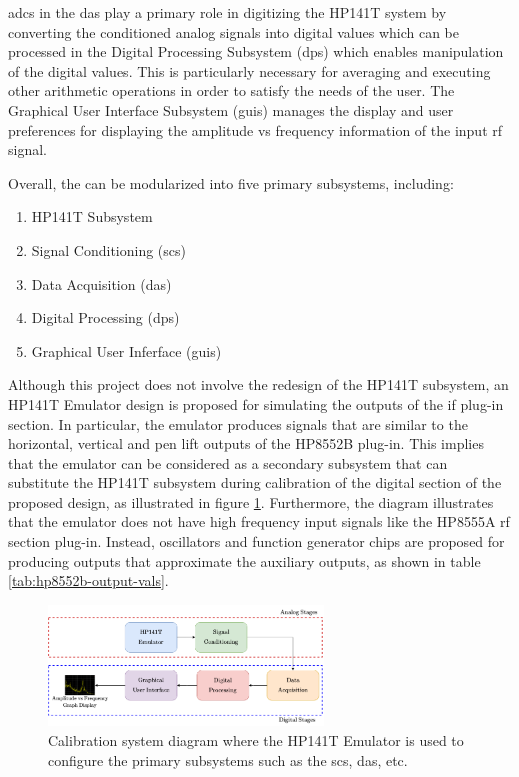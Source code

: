 \documentclass[class=report,11pt,crop=false]{standalone}
\begin{document}
	\acrshort{adc}s in the \acrshort{das} play a primary role in digitizing the HP141T system by converting the conditioned analog signals into digital values which can be processed in the Digital Processing Subsystem (\acrshort{dps}) which enables manipulation of the digital values. This is particularly necessary for averaging and executing other arithmetic operations in order to satisfy the needs of the user. The Graphical User Interface Subsystem (\acrshort{guis}) manages the display and user preferences for displaying the amplitude vs frequency information of the input \acrshort{rf} signal.
		
	Overall, the can be modularized into five primary subsystems, including:
	\begin{enumerate}
		\item 
		HP141T Subsystem
		\item 
		Signal Conditioning (\acrshort{scs})
		\item 
		Data Acquisition (\acrshort{das})
		\item 
		Digital Processing (\acrshort{dps})
		\item 
		Graphical User Inferface (\acrshort{guis})
	\end{enumerate}
	
	Although this project does not involve the redesign of the HP141T subsystem, an HP141T Emulator design is proposed for simulating the outputs of the \acrshort{if} plug-in section. In particular, the emulator produces signals that are similar to the horizontal, vertical and pen lift outputs of the HP8552B plug-in. This implies that the emulator can be considered as a secondary subsystem that can substitute the HP141T subsystem during calibration of the digital section of the proposed design, as illustrated in figure \ref{fig:emulated-system-diagram}. Furthermore, the diagram illustrates that the emulator does not have high frequency input signals like the HP8555A \acrshort{rf} section plug-in. Instead, oscillators and function generator chips are proposed for producing outputs that approximate the auxiliary outputs, as shown in table \ref{tab:hp8552b-output-vals}.
	
	\begin{figure}[ht!]
		\centering
		\includegraphics[width=0.65\textwidth]{Figures/Methodology/emulated-system-diagram}
		\caption{Calibration system diagram where the HP141T Emulator is used to configure the primary subsystems such as the \acrshort{scs}, \acrshort{das}, etc.}
		\label{fig:emulated-system-diagram}
	\end{figure}
\end{document}
